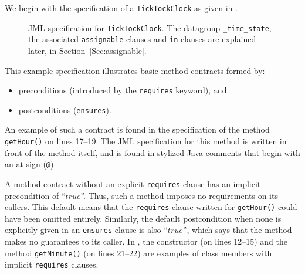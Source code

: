 \documentclass{llncs}
\begin{document}
%
We begin with the specification of a \texttt{TickTockClock} as given in
.
\begin{figure}[tbp]
%
%
\vspace*{-2ex} %
\caption{\label{Example:TickTockClock}JML specification for \texttt{TickTockClock}.
  The datagroup \texttt{\_time\_state}, the
  associated \texttt{assignable} clauses and \texttt{in} clauses are
  explained later, in Section~\ref{Sec:assignable}.} 
\end{figure}
This example specification illustrates basic
method contracts formed by:
%
\begin{itemize}
  \item preconditions (introduced by the \texttt{requires} keyword), and
  \item postconditions (\texttt{ensures}).
\end{itemize}
An example of such a contract is found in the specification of the
method \texttt{getHour()} on lines 17--19.  The JML specification for
this method is written in front of the method itself, and is found in
stylized Java comments 
that begin with an at-sign (\texttt{@}).

%

% 
%
A method contract without an explicit \texttt{requires} clause has
an implicit precondition of ``$true$''.  Thus, such a
method imposes no requirements on its callers.  This default means
that the \texttt{requires} clause written for \texttt{getHour()} could
have been omitted entirely.
Similarly, the default postcondition 
when none is explicitly given in an \texttt{ensures} clause is also
``$true$'', which says that the method makes no guarantees to
its caller.
In , the constructor (on lines 12--15)
and the method \texttt{getMinute()} (on lines 21--22) are
examples of class members with implicit \texttt{requires} clauses.
\end{document}
